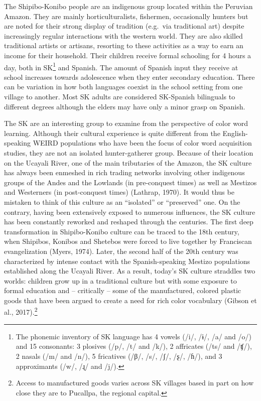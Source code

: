 \documentclass[
  english,
  ,apa7,floatsintext]{apa6}
\begin{document}
The Shipibo-Konibo people are an indigenous group located within the Peruvian Amazon. They are mainly horticulturalists, fishermen, occasionally hunters but are noted for their strong display of tradition (e.g.~via traditional art) despite increasingly regular interactions with the western world. They are also skilled traditional artists or artisans, resorting to these activities as a way to earn an income for their household. Their children receive formal schooling for 4 hours a day, both in SK\footnote{The phonemic inventory of SK language has 4 vowels (/i/, /ɨ/, /a/ and /o/) and 15 consonants: 3 plosives (/p/, /t/ and /k/), 2 affricates (/ts/ and /ʧ/), 2 nasals (/m/ and /n/), 5 fricatives (/β/, /s/, /ʃ/, /ʂ/, /ɦ/), and 3 approximants (/w/, /ɻ/ and /j/).} and Spanish. The amount of Spanish input they receive at school increases towards adolescence when they enter secondary education. There can be variation in how both languages coexist in the school setting from one village to another. Most SK adults are considered SK-Spanish bilinguals to different degrees although the elders may have only a minor grasp on Spanish.

The SK are an interesting group to examine from the perspective of color word learning. Although their cultural experience is quite different from the English-speaking WEIRD populations who have been the focus of color word acquisition studies, they are not an isolated hunter-gatherer group. Because of their location on the Ucayali River, one of the main tributaries of the Amazon, the SK culture has always been enmeshed in rich trading networks involving other indigenous groups of the Andes and the Lowlands (in pre-conquest times) as well as Mestizos and Westerners (in post-conquest times) (Lathrap, 1970). It would thus be mistaken to think of this culture as an ``isolated'' or ``preserved'' one. On the contrary, having been extensively exposed to numerous influences, the SK culture has been constantly reworked and reshaped through the centuries. The first deep transformation in Shipibo-Konibo culture can be traced to the 18th century, when Shipibos, Konibos and Shetebos were forced to live together by Franciscan evangelization (Myers, 1974). Later, the second half of the 20th century was characterized by intense contact with the Spanish-speaking Mestizo populations established along the Ucayali River. As a result, today's SK culture straddles two worlds: children grow up in a traditional culture but with some exposure to formal education and -- critically -- some of the manufactured, colored plastic goods that have been argued to create a need for rich color vocabulary (Gibson et al., 2017).\footnote{Access to manufactured goods varies across SK villages based in part on how close they are to Pucallpa, the regional capital.}
\end{document}
